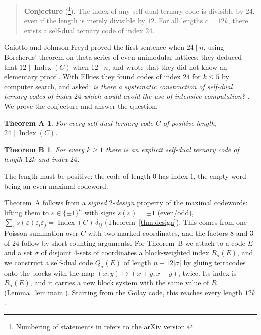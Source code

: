 \documentclass[11pt]{amsart}
\newtheorem*{thmA}{Theorem A}
\newtheorem*{thmB}{Theorem B}
\theoremstyle{definition}
\newcommand{\Index}{\operatorname{Index}}
\begin{document}
\begin{quote}
\textbf{Conjecture} (\cite[Conj.~1.4]{GJF}\footnote{Numbering of statements in \cite{GJF} refers
to the arXiv version.}). The index of any self-dual ternary code is divisible by $24$, even if the
length is merely divisible by $12$. For all lengths $c=12k$, there exists a self-dual ternary code
of index $24$.
\end{quote}

Gaiotto and Johnson-Freyd proved the first sentence when $24\mid n$, using Borcherds' theorem on
theta series of even unimodular lattices; they deduced that $12\mid\Index(C)$ when $12\mid n$, and
wrote that they did not know an elementary proof \cite[Thm.~1.3]{GJF}. With
Elkies they found codes of index $24$ for $k\le5$ by computer search, and asked: \emph{is there a
systematic construction of self-dual ternary codes of index $24$ which would avoid the use of
intensive computation?} \cite[Question~0.1]{GJF}. We prove the conjecture and answer the question.

\begin{thmA}
For every self-dual ternary code $C$ of positive length, $24\mid\Index(C)$.
\end{thmA}

\begin{thmB}
For every $k\ge1$ there is an explicit self-dual ternary code of length $12k$ and index $24$.
\end{thmB}

The length must be positive: the code of length $0$ has index $1$, the empty word being an even
maximal codeword.

Theorem~A follows from a \emph{signed $2$-design} property of the maximal codewords: lifting them
to $\varepsilon\in\{\pm1\}^n$ with signs $s(\varepsilon)=\pm1$ (even/odd),
$\sum_\varepsilon s(\varepsilon)\varepsilon_i\varepsilon_j=\Index(C)\,\delta_{ij}$
(Theorem~\ref{thm:design}). This comes from one Poisson summation over $C$ with two marked
coordinates, and the factors $8$ and $3$ of $24$ follow by short counting arguments. For
Theorem~B we attach to a code $E$ and a set $\sigma$ of disjoint $4$-sets of coordinates a
block-weighted index $R_\sigma(E)$, and we construct a self-dual code $Q_\sigma(E)$ of length
$n+12|\sigma|$ by gluing tetracodes onto the blocks with the map $(x,y)\mapsto(x+y,x-y)$, twice.
Its index is $R_\sigma(E)$, and it carries a new block system with the same value of $R$
(Lemma~\ref{lem:main}). Starting from the Golay code, this reaches every length $12k$.
\end{document}
